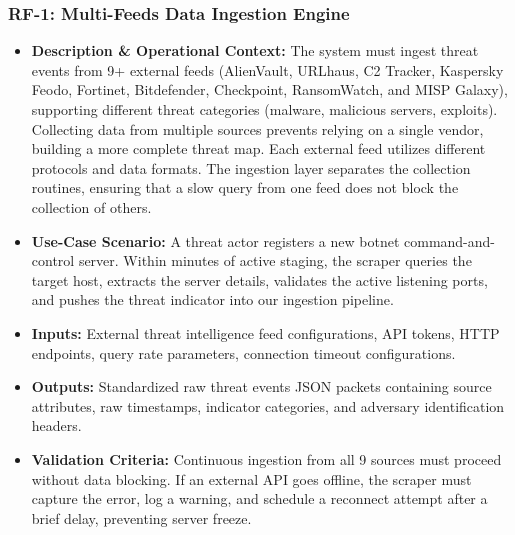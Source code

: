 \subsubsection{RF-1: Multi-Feeds Data Ingestion Engine}
\begin{itemize}
    \item \textbf{Description \& Operational Context:} The system must ingest threat events from 9+ external feeds (AlienVault, \allowbreak URLhaus, \allowbreak C2 Tracker, \allowbreak Kaspersky Feodo, \allowbreak Fortinet, \allowbreak Bitdefender, \allowbreak Checkpoint, \allowbreak RansomWatch, \allowbreak and MISP Galaxy), supporting different threat categories (malware, malicious servers, exploits). Collecting data from multiple sources prevents relying on a single vendor, building a more complete threat map. Each external feed utilizes different protocols and data formats. The ingestion layer separates the collection routines, ensuring that a slow query from one feed does not block the collection of others.
    \item \textbf{Use-Case Scenario:} A threat actor registers a new botnet command-and-control server. Within minutes of active staging, the scraper queries the target host, extracts the server details, validates the active listening ports, and pushes the threat indicator into our ingestion pipeline.
    \item \textbf{Inputs:} External threat intelligence feed configurations, API tokens, HTTP endpoints, query rate parameters, connection timeout configurations.
    \item \textbf{Outputs:} Standardized raw threat events JSON packets containing source attributes, raw timestamps, indicator categories, and adversary identification headers.
    \item \textbf{Validation Criteria:} Continuous ingestion from all 9 sources must proceed without data blocking. If an external API goes offline, the scraper must capture the error, log a warning, and schedule a reconnect attempt after a brief delay, preventing server freeze.
\end{itemize}

